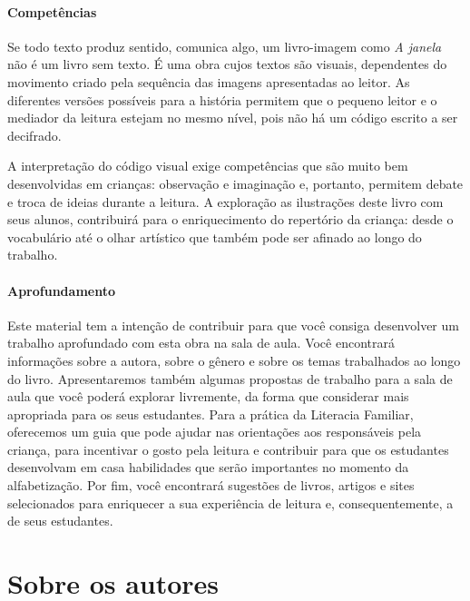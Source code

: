 \documentclass[11pt]{extarticle}
\begin{document}
\paragraph{Competências}
Se todo texto produz sentido, comunica algo, 
um livro-imagem como \textit{A janela} não é um livro sem texto. É uma 
obra cujos textos são visuais, dependentes do movimento criado pela 
sequência das imagens apresentadas ao leitor. As diferentes versões possíveis 
para a história permitem que o pequeno leitor e o mediador da leitura estejam 
no mesmo nível, pois não há um código escrito a ser decifrado. 

A interpretação do código visual 
exige competências que são muito bem desenvolvidas em crianças: 
observação e imaginação e, portanto, permitem debate e troca de ideias durante 
a leitura. A exploração as ilustrações deste livro com seus alunos, contribuirá 
para o enriquecimento do repertório da criança: desde o vocabulário até o 
olhar artístico que também pode ser afinado ao longo do trabalho.


\paragraph{Aprofundamento} Este material tem a 
intenção de contribuir para que você consiga desenvolver um trabalho aprofundado 
com esta obra na sala de aula. Você encontrará informações sobre a autora, sobre 
o gênero e sobre os temas trabalhados ao longo do livro. Apresentaremos também 
algumas propostas de trabalho para a sala de aula que você poderá explorar livremente, 
da forma que considerar mais apropriada para os seus estudantes. Para a prática 
da Literacia Familiar, oferecemos um guia que pode ajudar nas orientações aos 
responsáveis pela criança, para incentivar o gosto pela leitura e contribuir para 
que os estudantes desenvolvam em casa habilidades que serão importantes no momento 
da alfabetização. Por fim, você encontrará sugestões de livros, artigos e sites 
selecionados para enriquecer a sua experiência de leitura e, 
consequentemente, a de seus estudantes.



\section{Sobre os autores}

\reversemarginpar
\marginparwidth=5cm
\end{document}
